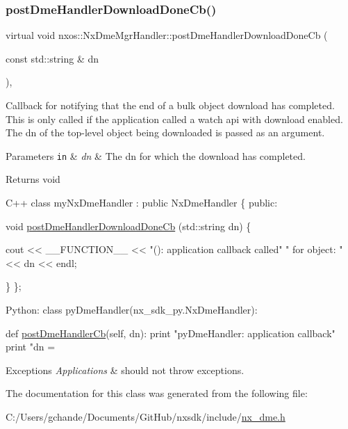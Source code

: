 \subsubsection{\texorpdfstring{post\+Dme\+Handler\+Download\+Done\+Cb()}{postDmeHandlerDownloadDoneCb()}}
{\footnotesize\ttfamily virtual void nxos\+::\+Nx\+Dme\+Mgr\+Handler\+::post\+Dme\+Handler\+Download\+Done\+Cb (\begin{DoxyParamCaption}\item[{const std\+::string \&}]{dn }\end{DoxyParamCaption})\hspace{0.3cm}{\ttfamily [inline]}, {\ttfamily [virtual]}}

Callback for notifying that the end of a bulk object download has completed. This is only called if the application called a watch api with download enabled. The dn of the top-\/level object being downloaded is passed as an argument. 
\begin{DoxyParams}[1]{Parameters}
\mbox{\tt in}  & {\em dn} & The dn for which the download has completed. \\
\hline
\end{DoxyParams}
\begin{DoxyReturn}{Returns}
void 
\begin{DoxyCode}
C++
  \textcolor{keyword}{class }myNxDmeHandler : \textcolor{keyword}{public} NxDmeHandler \{
  \textcolor{keyword}{public}:

    \textcolor{keywordtype}{void} \mbox{\hyperlink{classnxos_1_1_nx_dme_mgr_handler_a785b584b966bb8212c22e506ff568236}{postDmeHandlerDownloadDoneCb}} (std::string dn)
    \{

      cout << \_\_FUNCTION\_\_ << \textcolor{stringliteral}{"(): application callback called"}
         \textcolor{stringliteral}{"  for object: "} << dn  << endl;

    \}
  \};

Python:
  \textcolor{keyword}{class }pyDmeHandler(nx\_sdk\_py.NxDmeHandler):

     def \mbox{\hyperlink{classnxos_1_1_nx_dme_mgr_handler_a26838519d4f1d17c2036feb036a0e892}{postDmeHandlerCb}}(self, dn):
         print "pyDmeHandler: application callback"
         print "dn = %
\end{DoxyCode}

\end{DoxyReturn}

\begin{DoxyExceptions}{Exceptions}
{\em Applications} & should not throw exceptions. \\
\hline
\end{DoxyExceptions}


The documentation for this class was generated from the following file\+:\begin{DoxyCompactItemize}
\item 
C\+:/\+Users/gchande/\+Documents/\+Git\+Hub/nxsdk/include/\mbox{\hyperlink{nx__dme_8h}{nx\+\_\+dme.\+h}}\end{DoxyCompactItemize}
